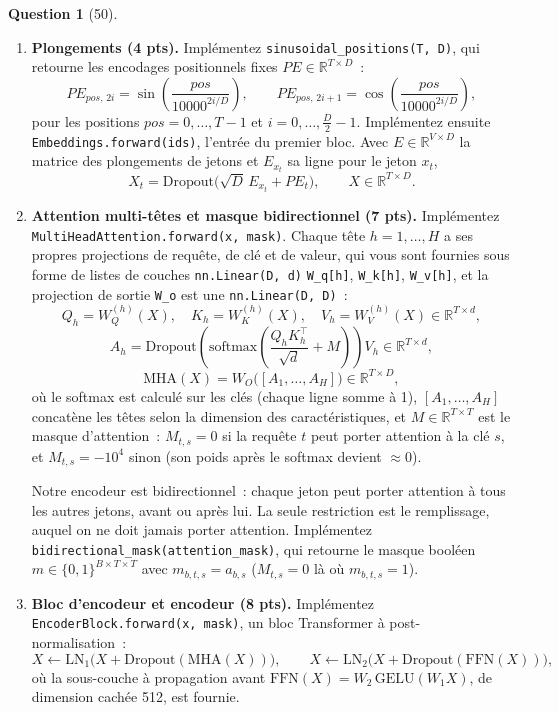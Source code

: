 \documentclass[12pt]{article}
\theoremstyle{definition}
\newtheorem{exercise}{Question}%
\begin{document}
\begin{exercise}[50]
\begin{enumerate}
  \item \textbf{Plongements (4 pts).} Implémentez \texttt{sinusoidal\_positions(T, D)}, qui retourne les encodages
  positionnels fixes $PE \in \mathbb{R}^{T \times D}$~:
  \[
    PE_{pos,\,2i} = \sin\!\left(\frac{pos}{10000^{2i/D}}\right), \qquad
    PE_{pos,\,2i+1} = \cos\!\left(\frac{pos}{10000^{2i/D}}\right),
  \]
  pour les positions $pos = 0, \dots, T-1$ et $i = 0, \dots, \tfrac{D}{2}-1$.
  Implémentez ensuite \texttt{Embeddings.forward(ids)}, l'entrée du premier bloc. Avec
  $E \in \mathbb{R}^{V \times D}$ la matrice des plongements de jetons et $E_{x_t}$ sa ligne pour le jeton $x_t$,
  \[
    X_t = \mathrm{Dropout}\big(\sqrt{D}\, E_{x_t} + PE_t\big), \qquad X \in \mathbb{R}^{T \times D}.
  \]

  \item \textbf{Attention multi-têtes et masque bidirectionnel (7 pts).} Implémentez
  \texttt{MultiHeadAttention.forward(x, mask)}. Chaque tête $h = 1, \dots, H$ a ses propres projections de requête,
  de clé et de valeur, qui vous sont fournies sous forme de listes de couches \texttt{nn.Linear(D, d)}
  \texttt{W\_q[h]}, \texttt{W\_k[h]}, \texttt{W\_v[h]}, et la projection de sortie \texttt{W\_o} est une
  \texttt{nn.Linear(D, D)}~:
  \[
    Q_h = W_Q^{(h)}(X), \quad K_h = W_K^{(h)}(X), \quad V_h = W_V^{(h)}(X) \in \mathbb{R}^{T \times d},
  \]
  \[
    A_h = \mathrm{Dropout}\!\left(\mathrm{softmax}\!\left(\frac{Q_h K_h^\top}{\sqrt{d}} + M\right)\right) V_h
    \in \mathbb{R}^{T \times d},
  \]
  \[
    \mathrm{MHA}(X) = W_O\big([A_1, \dots, A_H]\big) \in \mathbb{R}^{T \times D},
  \]
  où le softmax est calculé sur les clés (chaque ligne somme à 1), $[A_1, \dots, A_H]$ concatène les têtes selon la
  dimension des caractéristiques, et $M \in \mathbb{R}^{T \times T}$ est le masque d'attention~: $M_{t,s} = 0$ si la
  requête $t$ peut porter attention à la clé $s$, et $M_{t,s} = -10^4$ sinon (son poids après le softmax devient
  $\approx 0$).


  Notre encodeur est bidirectionnel~: chaque jeton peut porter attention à tous les autres jetons, avant ou après
  lui. La seule restriction est le remplissage, auquel on ne doit jamais porter attention. Implémentez
  \texttt{bidirectional\_mask(attention\_mask)}, qui retourne le masque booléen
  $m \in \{0, 1\}^{B \times T \times T}$ avec $m_{b,t,s} = a_{b,s}$ ($M_{t,s} = 0$ là où $m_{b,t,s} = 1$).

  \item \textbf{Bloc d'encodeur et encodeur (8 pts).} Implémentez \texttt{EncoderBlock.forward(x, mask)}, un bloc
  Transformer à post-normalisation~:
  \[
    X \leftarrow \mathrm{LN}_1\big(X + \mathrm{Dropout}(\mathrm{MHA}(X))\big), \qquad
    X \leftarrow \mathrm{LN}_2\big(X + \mathrm{Dropout}(\mathrm{FFN}(X))\big),
  \]
  où la sous-couche à propagation avant $\mathrm{FFN}(X) = W_2\, \mathrm{GELU}(W_1 X)$, de dimension cachée 512, est
  fournie.



\end{enumerate}
\end{exercise}
\end{document}
